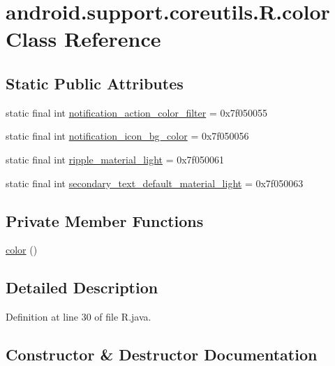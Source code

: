 \hypertarget{classandroid_1_1support_1_1coreutils_1_1_r_1_1color}{}\section{android.\+support.\+coreutils.\+R.\+color Class Reference}
\label{classandroid_1_1support_1_1coreutils_1_1_r_1_1color}
\subsection*{Static Public Attributes}
\begin{DoxyCompactItemize}
\item 
static final int \mbox{\hyperlink{classandroid_1_1support_1_1coreutils_1_1_r_1_1color_a7a57235ba2f01f2a77766f32f9505593}{notification\+\_\+action\+\_\+color\+\_\+filter}} = 0x7f050055
\item 
static final int \mbox{\hyperlink{classandroid_1_1support_1_1coreutils_1_1_r_1_1color_a870ee184f70eb0ba5f8b597bb81ef1e4}{notification\+\_\+icon\+\_\+bg\+\_\+color}} = 0x7f050056
\item 
static final int \mbox{\hyperlink{classandroid_1_1support_1_1coreutils_1_1_r_1_1color_a2bb831d5cf5464fbe7a270446353ed6f}{ripple\+\_\+material\+\_\+light}} = 0x7f050061
\item 
static final int \mbox{\hyperlink{classandroid_1_1support_1_1coreutils_1_1_r_1_1color_aae8ae33c65014cccc6bfd139de0c1990}{secondary\+\_\+text\+\_\+default\+\_\+material\+\_\+light}} = 0x7f050063
\end{DoxyCompactItemize}
\subsection*{Private Member Functions}
\begin{DoxyCompactItemize}
\item 
\mbox{\hyperlink{classandroid_1_1support_1_1coreutils_1_1_r_1_1color_aec3d401290eb7605e34f6c6e67626b9a}{color}} ()
\end{DoxyCompactItemize}


\subsection{Detailed Description}


Definition at line 30 of file R.\+java.



\subsection{Constructor \& Destructor Documentation}
\mbox{\label{classandroid_1_1support_1_1coreutils_1_1_r_1_1color_aec3d401290eb7605e34f6c6e67626b9a}} 
